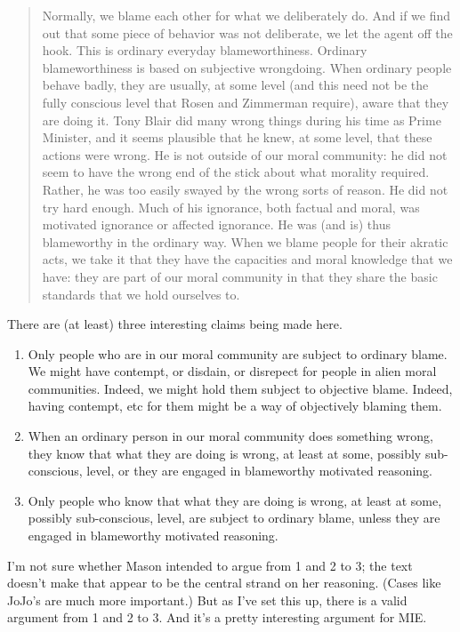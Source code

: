 \begin{quote}
Normally, we blame each other for what we deliberately do. And if we find out that some piece of behavior was not deliberate, we let the agent off the hook. This is ordinary everyday blameworthiness. Ordinary blameworthiness is based on subjective wrongdoing. When ordinary people behave badly, they are usually, at some level (and this need not be the fully conscious level that Rosen and Zimmerman require), aware that they are doing it. Tony Blair did many wrong things during his time as Prime Minister, and it seems plausible that he knew, at some level, that these actions were wrong. He is not outside of our moral community: he did not seem to have the wrong end of the stick about what morality required. Rather, he was too easily swayed by the wrong sorts of reason. He did not try hard enough. Much of his ignorance, both factual and moral, was motivated ignorance or affected ignorance. He was (and is) thus blameworthy in the ordinary way. When we blame people for their akratic acts, we take it that they have the capacities and moral knowledge that we have: they are part of our moral community in that they share the basic standards that we hold ourselves to. ~\citep[12]{Mason2015}
\end{quote}
There are (at least) three interesting claims being made here.

\begin{enumerate}
\item{} Only people who are in our moral community are subject to ordinary blame. We might have contempt, or disdain, or disrepect for people in alien moral communities. Indeed, we might hold them subject to objective blame. Indeed, having contempt, etc for them might be a way of objectively blaming them.

\item{} When an ordinary person in our moral community does something wrong, they know that what they are doing is wrong, at least at some, possibly sub-conscious, level, or they are engaged in blameworthy motivated reasoning.

\item{} Only people who know that what they are doing is wrong, at least at some, possibly sub-conscious, level, are subject to ordinary blame, unless they are engaged in blameworthy motivated reasoning.

\end{enumerate}
I'm not sure whether Mason intended to argue from 1 and 2 to 3; the text doesn't make that appear to be the central strand on her reasoning. (Cases like JoJo's are much more important.) But as I've set this up, there is a valid argument from 1 and 2 to 3. And it's a pretty interesting argument for MIE.

